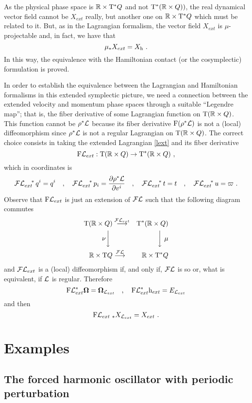 \documentclass[12pt]{report}
\def\beann{\begin{eqnarray*}}
\def\eeann{\end{eqnarray*}}
\def\derpar#1#2{\frac{\partial{#1}}{\partial{#2}}}
\def\mapping#1{\mathrel{\mathop{\longrightarrow}\limits^{#1}}}
\def\Lag{{\cal L}}
\def\Real{\mathbb{R}}
\def\Tan{{\rm T}}
\def\Leg{{\cal F}\Lag}
\begin{document}
As the physical phase space is $\Real \times \Tan^*Q$ 
and not $\Tan^*(\Real \times Q))$,
the real dynamical vector field  cannot be $X_{ext}$ really, 
but another one on $\Real \times \Tan^*Q$ which must be related to it.
But, as in the Lagrangian formalism, the vector field $X_{ext}$ is $\mu$-projectable
and, in fact, we have that
$$
\mu_* X_{ext} = X_{\rm h} \ .
$$
In this way, the equivalence with the Hamiltonian contact 
(or the cosymplectic) formulation is proved.

In order to establish the equivalence between the Lagrangian and Hamiltonian formalisms
in this extended symplectic picture, we need a connection between the
extended velocity and momentum phase spaces through a suitable ``Legendre map'';
that is, the fiber derivative of some Lagrangian function on $\Tan(\Real \times Q)$.
This function cannot be $\rho^*{\cal L}$ because its fiber derivative
${\rm F}(\rho^*{\cal L})$ is not a (local) diffeomorphism since
$\rho^*{\cal L}$ is not a regular Lagrangian on $\Tan(\Real\times Q)$.
The correct choice consists in taking the extended Lagrangian \eqref{lext}
and its fiber derivative
$$
{\rm F}{\cal L}_{ext} : \Tan (\Real\times Q ) \to \Tan^*(\Real \times Q) \ ,
$$
which in coordinates is
\beann
\Leg_{ext}^{\quad *}\,q^i = q^i \quad , \quad
\Leg_{ext}^{\quad *} \,p_i = \derpar{\rho^*{\cal L}}{v^i} \quad , \quad
\Leg_{ext}^{\quad *} \,t = t \quad , \quad 
\Leg_{ext}^{\quad *} \,u = \varpi  \ .
\eeann
Observe that ${\rm F}{\cal L}_{ext}$ is just an extension of $\Leg$
such that the following diagram commutes
\beann
\Tan ( \Real\times Q) & \mapping{{\cal F}{\cal L}_{ext}} &
\Tan^*(\Real \times Q)
\\
\nu \biggr \downarrow \  &          & \quad \biggr \downarrow \ \mu
\\
\Real\times\Tan Q        & \mapping{\Leg}      & \Real\times\Tan^*Q 
\eeann
and ${\cal F}{\cal L}_{ext}$ is a (local) diffeomorphism if, and only if, $\Leg$ is so
or, what is equivalent, if ${\cal L}$ is regular.
Therefore
$$
{\rm F}{\cal L}_{ext}^*{\mathbf \Omega} = {\mathbf \Omega}_{{\cal L}_{ext}}
\quad , \quad
{\rm F}{\cal L}_{ext}^*{\rm h}_{ext} = E_{{\cal L}_{ext}}
$$
and then
$$
{\rm F}{\cal L}_{{ext}\ *}X_{{\cal L}_{ext}} = X_{ext}  \ .
$$


\section{Examples}


\subsection{The forced harmonic oscillator with periodic perturbation}
\end{document}
